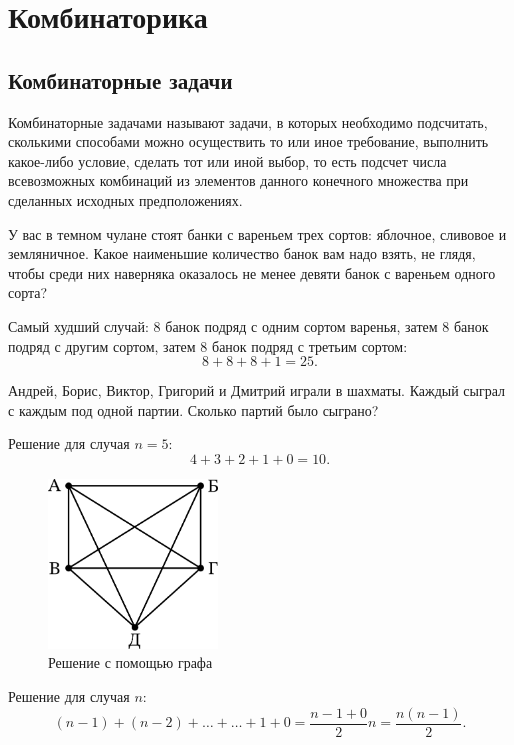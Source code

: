 \section{Комбинаторика}

\subsection{Комбинаторные задачи}

Комбинаторные задачами называют задачи, в которых необходимо подсчитать, сколькими способами можно осуществить то или иное требование, выполнить какое-либо условие, сделать тот или иной выбор, то есть подсчет числа всевозможных комбинаций из элементов данного конечного множества при сделанных исходных предположениях.

\begin{example}
    У вас в темном чулане стоят банки с вареньем трех сортов: яблочное, сливовое и земляничное. Какое наименьшие количество банок вам надо взять, не глядя, чтобы среди них наверняка оказалось не менее девяти банок с вареньем одного сорта?

    Самый худший случай: \(8\) банок подряд с одним сортом варенья, затем \(8\) банок подряд с другим сортом, затем \(8\) банок подряд с третьим сортом:
    \[
        8 + 8 + 8 + 1 = 25.
    \]
\end{example}

\begin{example}
    Андрей, Борис, Виктор, Григорий и Дмитрий играли в шахматы. Каждый сыграл с каждым под одной партии. Сколько партий было сыграно?

    Решение для случая \(n = 5\):
    \[
        4 + 3 + 2 + 1 + 0 = 10.
    \]

    \begin{figure}[H]
        \centering
        \includegraphics[width=0.4\textwidth]{images/graph-combinatorics.png}
        \caption{Решение с помощью графа}
    \end{figure}

    Решение для случая \(n\):
    \[
        (n - 1) + (n - 2) + \ldots + \ldots + 1 + 0 = \frac{n -1 + 0}{2} n = \frac{n(n - 1)}{2}.
    \]
\end{example}

